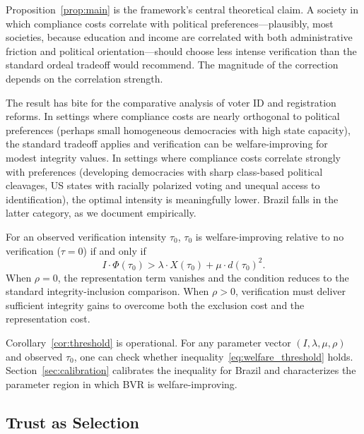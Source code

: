 Proposition~\ref{prop:main} is the framework's central theoretical claim. A society in which compliance costs correlate with political preferences---plausibly, most societies, because education and income are correlated with both administrative friction and political orientation---should choose less intense verification than the standard ordeal tradeoff would recommend. The magnitude of the correction depends on the correlation strength.

The result has bite for the comparative analysis of voter ID and registration reforms. In settings where compliance costs are nearly orthogonal to political preferences (perhaps small homogeneous democracies with high state capacity), the standard tradeoff applies and verification can be welfare-improving for modest integrity values. In settings where compliance costs correlate strongly with preferences (developing democracies with sharp class-based political cleavages, US states with racially polarized voting and unequal access to identification), the optimal intensity is meaningfully lower. Brazil falls in the latter category, as we document empirically.

\begin{corollary}
\label{cor:threshold}
For an observed verification intensity $\tau_0$, $\tau_0$ is welfare-improving relative to no verification ($\tau = 0$) if and only if
\begin{equation}
I \cdot \Phi(\tau_0) > \lambda \cdot X(\tau_0) + \mu \cdot d(\tau_0)^2.
\label{eq:welfare_threshold}
\end{equation}
When $\rho = 0$, the representation term vanishes and the condition reduces to the standard integrity-inclusion comparison. When $\rho > 0$, verification must deliver sufficient integrity gains to overcome both the exclusion cost and the representation cost.
\end{corollary}

Corollary~\ref{cor:threshold} is operational. For any parameter vector $(I, \lambda, \mu, \rho)$ and observed $\tau_0$, one can check whether inequality~\eqref{eq:welfare_threshold} holds. Section~\ref{sec:calibration} calibrates the inequality for Brazil and characterizes the parameter region in which BVR is welfare-improving.

\subsection{Trust as Selection}
\label{ssec:trust}

